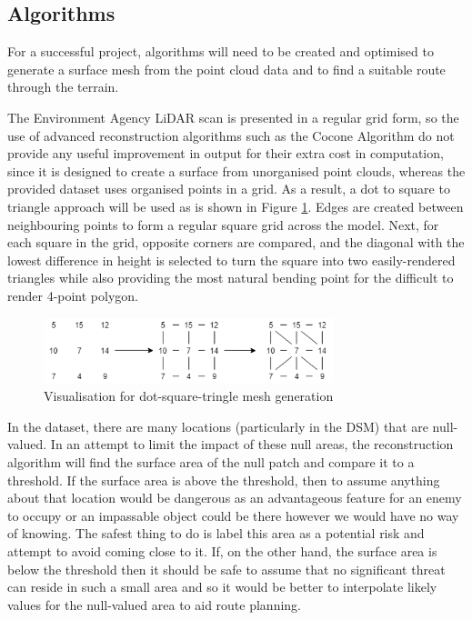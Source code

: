 \documentclass[12pt,a4paper]{article}
\begin{document}
  \subsection{Algorithms}
  \noindent For a successful project, algorithms will need to be created and optimised to generate a surface mesh from the point cloud data and to find a suitable route through the terrain.
  \par The Environment Agency LiDAR scan is presented in a regular grid form, so the use of advanced reconstruction algorithms such as the Cocone Algorithm do not provide any useful improvement in output for their extra cost in computation, since it is designed to create a surface from unorganised point clouds, whereas the provided dataset uses organised points in a grid. As a result, a dot to square to triangle approach will be used as is shown in Figure \ref{dot_square_triangle_fig}. Edges are created between neighbouring points to form a regular square grid across the model. Next, for each square in the grid, opposite corners are compared, and the diagonal with the lowest difference in height is selected to turn the square into two easily-rendered triangles while also providing the most natural bending point for the difficult to render 4-point polygon.
  \begin{figure}[htb]
    \centering
    \includegraphics[width=0.75\textwidth]{dot_square_triangle}
    \caption{Visualisation for dot-square-tringle mesh generation}
    \label{dot_square_triangle_fig}
  \end{figure}
  \par In the dataset, there are many locations (particularly in the DSM) that are null-valued. In an attempt to limit the impact of these null areas, the reconstruction algorithm will find the surface area of the null patch and compare it to a threshold. If the surface area is above the threshold, then to assume anything about that location would be dangerous as an advantageous feature for an enemy to occupy or an impassable object could be there however we would have no way of knowing. The safest thing to do is label this area as a potential risk and attempt to avoid coming close to it. If, on the other hand, the surface area is below the threshold then it should be safe to assume that no significant threat can reside in such a small area and so it would be better to interpolate likely values for the null-valued area to aid route planning.
\end{document}
